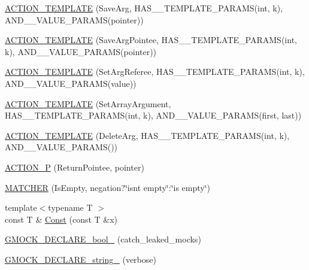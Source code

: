 \begin{DoxyCompactItemize}
\item 
\hyperlink{namespacetesting_a0478a3464d31f6726d5bc47b1be46491}{A\+C\+T\+I\+O\+N\+\_\+\+T\+E\+M\+P\+L\+A\+TE} (Save\+Arg, H\+A\+S\+\_\+\_\+\+T\+E\+M\+P\+L\+A\+T\+E\+\_\+\+P\+A\+R\+A\+MS(int, k), A\+N\+D\+\_\+\_\+\+V\+A\+L\+U\+E\+\_\+\+P\+A\+R\+A\+MS(pointer))
\item 
\hyperlink{namespacetesting_a31565a90ad7f08c1a88e4b138957172c}{A\+C\+T\+I\+O\+N\+\_\+\+T\+E\+M\+P\+L\+A\+TE} (Save\+Arg\+Pointee, H\+A\+S\+\_\+\_\+\+T\+E\+M\+P\+L\+A\+T\+E\+\_\+\+P\+A\+R\+A\+MS(int, k), A\+N\+D\+\_\+\_\+\+V\+A\+L\+U\+E\+\_\+\+P\+A\+R\+A\+MS(pointer))
\item 
\hyperlink{namespacetesting_adfd3c9538285d257370f955aa81488f1}{A\+C\+T\+I\+O\+N\+\_\+\+T\+E\+M\+P\+L\+A\+TE} (Set\+Arg\+Referee, H\+A\+S\+\_\+\_\+\+T\+E\+M\+P\+L\+A\+T\+E\+\_\+\+P\+A\+R\+A\+MS(int, k), A\+N\+D\+\_\+\_\+\+V\+A\+L\+U\+E\+\_\+\+P\+A\+R\+A\+MS(value))
\item 
\hyperlink{namespacetesting_a2b0f090219db3bb0630d5ce6f7d911d8}{A\+C\+T\+I\+O\+N\+\_\+\+T\+E\+M\+P\+L\+A\+TE} (Set\+Array\+Argument, H\+A\+S\+\_\+\_\+\+T\+E\+M\+P\+L\+A\+T\+E\+\_\+\+P\+A\+R\+A\+MS(int, k), A\+N\+D\+\_\+\_\+\+V\+A\+L\+U\+E\+\_\+\+P\+A\+R\+A\+MS(first, last))
\item 
\hyperlink{namespacetesting_a37a5ebfe68fd8dedf8bd82a5ebddcb7b}{A\+C\+T\+I\+O\+N\+\_\+\+T\+E\+M\+P\+L\+A\+TE} (Delete\+Arg, H\+A\+S\+\_\+\_\+\+T\+E\+M\+P\+L\+A\+T\+E\+\_\+\+P\+A\+R\+A\+MS(int, k), A\+N\+D\+\_\+\_\+\+V\+A\+L\+U\+E\+\_\+\+P\+A\+R\+A\+MS())
\item 
\hyperlink{namespacetesting_a3d58f0d746946064154cd257d368599d}{A\+C\+T\+I\+O\+N\+\_\+P} (Return\+Pointee, pointer)
\item 
\hyperlink{namespacetesting_a25b4065291778029b6311f07c2fc9cc3}{M\+A\+T\+C\+H\+ER} (Is\+Empty, negation?\char`\"{}isn\textquotesingle{}t empty\char`\"{}\+:\char`\"{}is empty\char`\"{})
\item 
{\footnotesize template$<$typename T $>$ }\\const T \& \hyperlink{namespacetesting_a945ac56c5508a3c9c032bbe8aae8dcfa}{Const} (const T \&x)
\item 
\hyperlink{namespacetesting_a9dd7591091234b86ce48ce1aff6feeb5}{G\+M\+O\+C\+K\+\_\+\+D\+E\+C\+L\+A\+R\+E\+\_\+bool\+\_\+} (catch\+\_\+leaked\+\_\+mocks)
\item 
\hyperlink{namespacetesting_a4dd099d1d538f26a16fcc2f94011b37e}{G\+M\+O\+C\+K\+\_\+\+D\+E\+C\+L\+A\+R\+E\+\_\+string\+\_\+} (verbose)
\item 

\end{DoxyCompactItemize}
